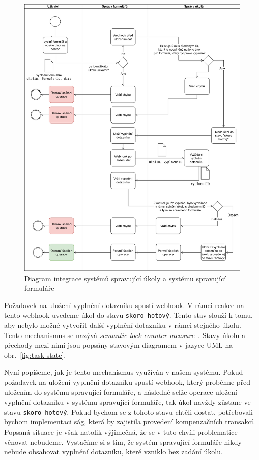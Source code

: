 \begin{figure}[H]
    \centering
    \includegraphics[width=\textwidth]{diagrams/activity.drawio}
    \caption{Diagram integrace systémů spravující úkoly a systému spravující formuláře}\label{fig:activity-diagram-task-and-form-integration}
\end{figure}

Požadavek na uložení vyplnění dotazníku spustí webhook.
V rámci reakce na tento webhook uvedeme úkol do stavu \texttt{skoro hotový}.
Tento stav slouží k tomu, aby nebylo možné vytvořit další vyplnění dotazníku v rámci stejného úkolu.
Tento mechanismus se nazývá \emph{semantic lock counter-measure}~\cite{semantic-lock-countermeasure-def}.
Stavy úkolu a přechody mezi nimi jsou popsány stavovým diagramem v jazyce UML na obr.~\ref{fig:task-state}.

Nyní popíšeme, jak je tento mechanismus využíván v našem systému.
Pokud požadavek na uložení vyplnění dotazníku spustí webhook, který proběhne před uložením do systému spravující formuláře, a následně selže operace uložení vyplnění dotazníku v systému spravující formuláře, tak úkol navždy zůstane ve stavu \texttt{skoro hotový}.
Pokud bychom se z tohoto stavu chtěli dostat, potřebovali bychom implementaci \href{https://microservices.io/patterns/data/saga.html}{ság}, která by zajistila provedení kompenzačních transakcí.
Popsaná situace je však natolik výjimečná, že se v tuto chvíli problematice věnovat nebudeme.
Vystačíme si s tím, že systém spravující formuláře nikdy nebude obsahovat vyplnění dotazníku, které vzniklo bez zadání úkolu.

